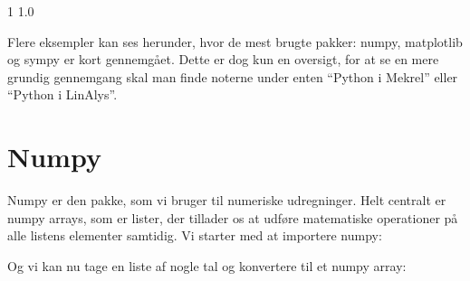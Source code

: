 \documentclass[letterpaper,10pt,english]{jupyterBook}
\begin{document}
\begin{sphinxVerbatim}[commandchars=\\\{\}]
\PYGZhy{}1
\PYGZhy{}1.0
\end{sphinxVerbatim}

\begin{sphinxVerbatim}[commandchars=\\\{\}]
       
  
  
\end{sphinxVerbatim}

\begin{sphinxVerbatim}[commandchars=\\\{\}]
[0.         0.00628319 0.01256637 ... 6.27061894 6.27690212 6.28318531]
\end{sphinxVerbatim}

\noindent{}

Flere eksempler kan ses  herunder, hvor de mest brugte pakker: numpy, matplotlib og sympy er kort gennemgået. Dette er dog kun en oversigt, for at se en mere grundig gennemgang skal man finde noterne under enten “Python i Mekrel” eller “Python i LinAlys”.


\section{Numpy}
\label{\detokenize{notebooks/Intro_til_pakker:numpy}}
Numpy er den pakke, som vi bruger til numeriske udregninger. Helt centralt er numpy arrays, som er lister, der tillader os at udføre matematiske operationer på alle listens elementer samtidig. Vi starter med at importere numpy:

\begin{sphinxVerbatim}[commandchars=\\\{\}]
   
\end{sphinxVerbatim}

Og vi kan nu tage en liste af nogle tal og konvertere til et numpy array:
\end{document}
